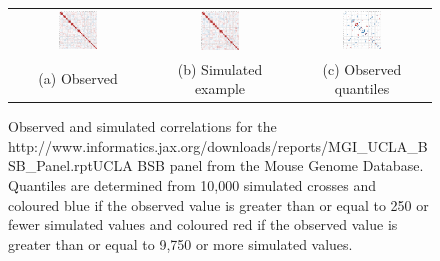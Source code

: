 \documentclass{article}
\newcommand{\href}[1]{#1} %
\begin{document}
\begin{figure}[htp]
  \begin{center}
    \begin{tabular}{ccc}
      \includegraphics[width = 0.300\textwidth]{./img/uclabsb.png} &
      \includegraphics[width = 0.300\textwidth]{./img/uclabsb_sim.png} &
      \includegraphics[width = 0.300\textwidth]{./img/uclabsb_quant.png} \\
      {\footnotesize (a) Observed} &
      {\footnotesize (b) Simulated example} &
      {\footnotesize (c) Observed quantiles} \\
    \end{tabular}
  \end{center}
  \caption{Observed and simulated correlations for the \href{http://www.informatics.jax.org/downloads/reports/MGI_UCLA_BSB_Panel.rpt}{UCLA BSB panel} from the Mouse Genome Database. Quantiles are determined from 10,000 simulated crosses and coloured blue if the observed value is greater than or equal to 250 or fewer simulated values and coloured red if the observed value is greater than or equal to 9,750 or more simulated values.}
  \label{fig:uclabsb}
\end{figure}
\end{document}

